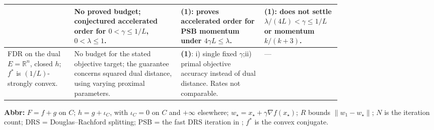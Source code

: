\begin{table}[tp]
\begin{threeparttable}
\begin{tabularx}{\linewidth}{@{}>{\raggedright\arraybackslash}p{0.20\linewidth}>{\raggedright\arraybackslash}p{0.32\linewidth}>{\raggedright\arraybackslash}p{0.25\linewidth}>{\raggedright\arraybackslash}X@{}}
& No proved budget; conjectured accelerated order for $0<\gamma\le1/L$, $0<\lambda\le1$.
& \textbf{(1)}: proves accelerated order for PSB momentum under $4\gamma L\le\lambda$.
& \textbf{(1)}: does not settle $\lambda/(4L)<\gamma\le1/L$ or momentum $k/(k+3)$. \\
\midrule
FDR on the dual \citep[Thm.~1]{drCJRA2026v2}\newline $E=\mathbb{R}^n$, closed $h$; $f^*$ is $(1/L)$-strongly convex.
& No budget for the stated objective target; the guarantee concerns squared dual distance, using varying proximal parameters.
& \textbf{(1)}: i) single fixed $\gamma$;\newline ii) primal objective accuracy instead of dual distance. Rates not comparable.
& --- \\
\bottomrule
\end{tabularx}
\begin{tablenotes}[flushleft]\footnotesize
\item[] \textbf{Abbr:} $F=f+g$ on $C$; $h=g+\iota_C$, with $\iota_C=0$ on $C$ and $+\infty$ elsewhere; $w_\star=x_\star+\gamma\nabla f(x_\star)$; $R$ bounds $\|w_1-w_\star\|$; $N$ is the iteration count; DRS = Douglas--Rachford splitting; PSB = the fast DRS iteration in \citep{drPSB2014v2}; $f^*$ is the convex conjugate.
\end{tablenotes}
\end{threeparttable}
\end{table}
\clearpage
